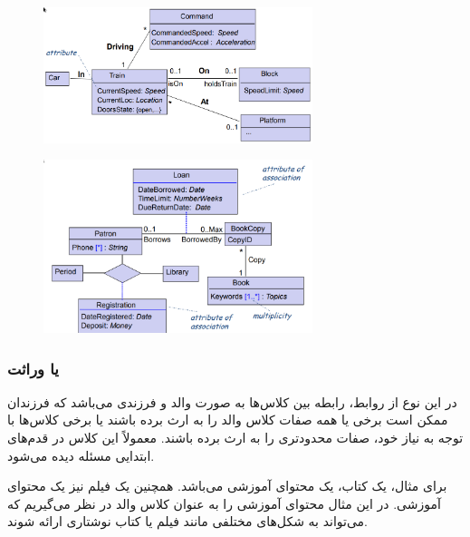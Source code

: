

\begin{figure}[H]
    \centering
    \includegraphics[width=0.7\textwidth]{images/association_diagram.png}
    \caption{}
\end{figure}

\begin{figure}[H]
    \centering
    \includegraphics[width=0.7\textwidth]{images/association_diagram_2.png}
    \caption{}
\end{figure}

\subsubsection{ یا وراثت}

در این نوع از روابط، رابطه بین کلاس‌ها به صورت والد و فرزندی می‌باشد که فرزندان
ممکن است برخی یا همه صفات کلاس والد را به ارث برده باشند یا برخی کلاس‌ها با توجه
به نیاز خود، صفات محدودتری را به ارث برده باشند. معمولاً این کلاس در قدم‌های
ابتدایی مسئله دیده می‌شود.

برای مثال، یک کتاب، یک محتوای آموزشی می‌باشد. همچنین یک فیلم نیز یک محتوای
آموزشی. در این مثال محتوای آموزشی را به عنوان کلاس والد در نظر می‌گیریم که
می‌تواند به شکل‌های مختلفی مانند فیلم یا کتاب نوشتاری ارائه شوند.

